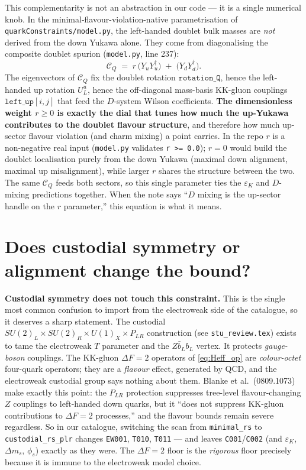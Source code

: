 \documentclass[11pt]{article}
\newcommand{\eps}{\varepsilon}
\newcommand{\SUL}{SU(2)_L}
\newcommand{\SUR}{SU(2)_R}
\newcommand{\UX}{U(1)_X}
\newcommand{\PLR}{P_{LR}}
\newcommand{\code}[1]{\texttt{#1}}
\newcommand{\CQ}{\mathcal{C}_Q}
\newcommand{\Yu}{Y_u}
\newcommand{\Yd}{Y_d}
\theoremstyle{definition}
\begin{document}
This complementarity is not an abstraction in our code --- it is a single
numerical knob. In the minimal-flavour-violation-native parametrisation of
\code{quarkConstraints/model.py}, the left-handed doublet bulk masses are
\emph{not} derived from the down Yukawa alone. They come from diagonalising the
composite doublet spurion (\code{model.py}, line 237):
\begin{equation}
\boxed{\;\CQ \;=\; r\,\big(\Yu\Yu^\dagger\big) \;+\; \big(\Yd\Yd^\dagger\big).\;}
\label{eq:CQ}
\end{equation}
The eigenvectors of $\CQ$ fix the doublet rotation $\mathtt{rotation\_Q}$, hence
the left-handed up rotation $U_L^u$, hence the off-diagonal mass-basis KK-gluon
couplings $\mathtt{left\_up}[i,j]$ that feed the $D$-system Wilson coefficients.
\textbf{The dimensionless weight $r\ge0$ is exactly the dial that tunes how much
the up-Yukawa contributes to the doublet flavour structure}, and therefore how
much up-sector flavour violation (and charm mixing) a point carries. In the
repo $r$ is a non-negative real input (\code{model.py} validates
\code{r >= 0.0}); $r=0$ would build the doublet localisation purely from the
down Yukawa (maximal down alignment, maximal up misalignment), while larger $r$
shares the structure between the two. The same $\CQ$ feeds both sectors, so this
single parameter ties the $\eps_K$ and $D$-mixing predictions together. When the
note says ``$D$ mixing is the up-sector handle on the $r$ parameter,'' this
equation is what it means.

\section{Does custodial symmetry or alignment change the bound?}
\label{sec:custodial}

\textbf{Custodial symmetry does not touch this constraint.} This is the single
most common confusion to import from the electroweak side of the catalogue, so
it deserves a sharp statement. The custodial
$\SUL\times\SUR\times\UX\times\PLR$ construction (see \code{stu\_review.tex})
exists to tame the electroweak $T$ parameter and the $Z\bar b_L b_L$ vertex. It
protects \emph{gauge-boson} couplings. The KK-gluon $\Delta F=2$ operators of
\eqref{eq:Heff_op} are \emph{colour-octet} four-quark operators; they are a
\emph{flavour} effect, generated by QCD, and the electroweak custodial group
says nothing about them. Blanke et al.\ (0809.1073) make exactly this point: the
$\PLR$ protection suppresses tree-level flavour-changing \emph{$Z$} couplings to
left-handed down quarks, but it ``does not suppress KK-gluon contributions to
$\Delta F=2$ processes,'' and the flavour bounds remain severe regardless. So in
our catalogue, switching the scan from \code{minimal\_rs} to
\code{custodial\_rs\_plr} changes \code{EW001}, \code{T010}, \code{T011} --- and
leaves \code{C001}/\code{C002} (and $\eps_K$, $\Delta m_s$, $\phi_s$) exactly as
they were. The $\Delta F=2$ floor is the \emph{rigorous} floor precisely because
it is immune to the electroweak model choice.
\end{document}
